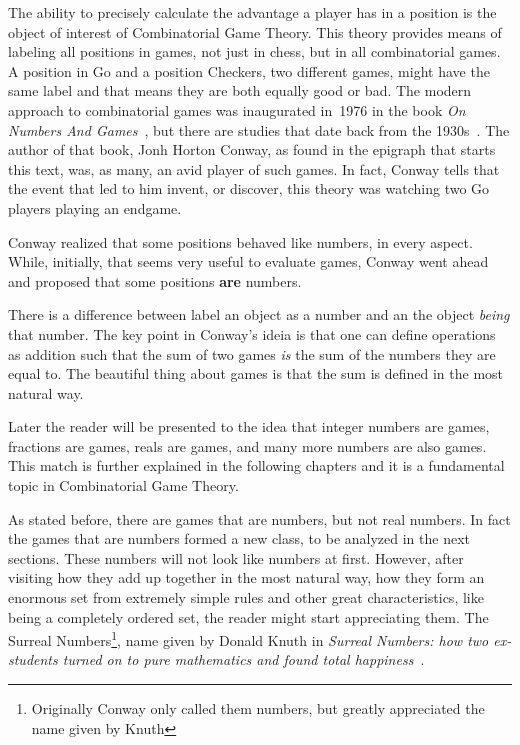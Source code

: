 The ability to precisely calculate the advantage a player has in a position is the object of interest of Combinatorial Game Theory. This theory provides means of labeling all positions in games, not just in chess, but in all combinatorial games. A position in Go and a position Checkers, two different games, might have the same label and that means they are both equally good or bad. The modern approach to combinatorial games was inaugurated in~1976 in the book \textit{On Numbers And Games}~\cite{ONAG1}, but there are studies that date back from the 1930s~\cite{CGT}. The author of that book, Jonh Horton Conway, as found in the epigraph that starts this text, was, as many, an avid player of such games. In fact, Conway tells that the event that led to him invent, or discover, this theory was watching two Go players playing an endgame.

Conway realized that some positions behaved like numbers, in every aspect. While, initially, that seems very useful to evaluate games, Conway went ahead and proposed that some positions \textbf{are} numbers.

There is a  difference between label an object as a number and an the object \textit{being} that number. The key point in Conway's ideia is that one can define operations as addition such that the sum of two games \textit{is} the sum of the numbers they are equal to. The beautiful thing about games is that the sum is defined in the most natural way.

Later the reader will be presented to the  idea that integer numbers are games, fractions are games, reals are games, and many more numbers are also games. This match is further explained in the following chapters and it is a fundamental topic in Combinatorial Game Theory.

As stated before, there are games that are numbers, but not real numbers. In fact the games that are numbers formed a new class, to be analyzed in the next sections. These numbers will not look like numbers at first. However, after visiting how they add up together in the most natural way, how they form an enormous set from extremely simple rules and other great characteristics, like being a completely ordered set, the reader might start appreciating them. The Surreal Numbers\footnote{Originally Conway only called them numbers, but greatly appreciated the name given by Knuth}, name given by Donald Knuth in \textit{Surreal Numbers: how two ex-students turned on to pure mathematics and found total happiness}~\cite{SN}.

